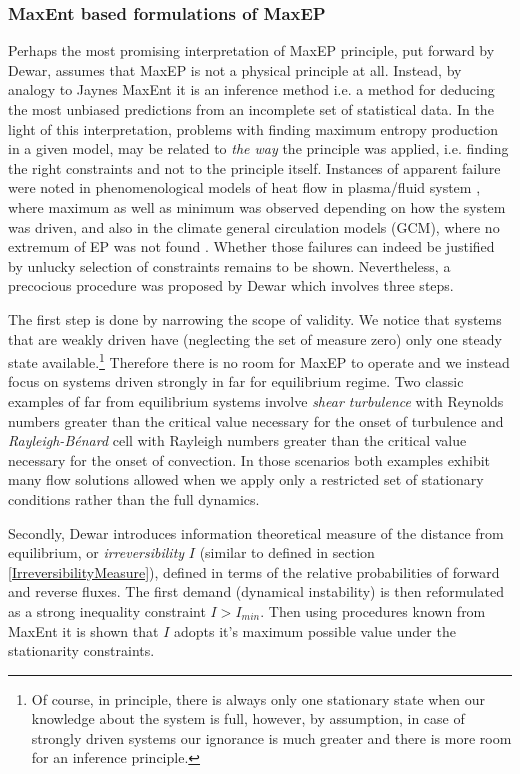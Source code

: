\documentclass[a4paper,12pt]{article}
\begin{document}
\subsubsection{MaxEnt based formulations of MaxEP}

Perhaps the most promising interpretation of MaxEP principle, put forward by Dewar\cite{Dewar:775452, Dewar:2009fg, Dewar:2005eo}, assumes that MaxEP is not a physical principle at all. Instead, by analogy to Jaynes MaxEnt it is an inference method i.e. a method for deducing the most unbiased predictions from an incomplete set of statistical data. In the light of this interpretation, problems with finding maximum entropy production in a given model, may be related to \textit{the way} the principle was applied, i.e. finding the right constraints and not to the principle itself.
Instances of apparent failure were noted in phenomenological models of heat flow in plasma/fluid system \cite{Kawazura:2010dy}, where maximum as well as minimum was observed depending on how the system was driven, and also in the climate general circulation models (GCM), where no extremum of EP was not found \cite{Dewar:2014ek}.
Whether those failures can indeed be justified by unlucky selection of constraints remains to be shown. Nevertheless, a precocious procedure was proposed by Dewar which involves three steps.

The first step is done by narrowing the scope of validity. We notice that systems that are weakly driven have (neglecting the set of measure zero) only one steady state available.\footnote{Of course, in principle, there is always only one stationary state when our knowledge about the system is full, however, by assumption, in case of strongly driven systems our ignorance is much greater and there is more room for an inference principle.} Therefore there is no room for MaxEP to operate and we instead focus on systems driven strongly in far for equilibrium regime.
Two classic examples of far from equilibrium systems involve \textit{shear turbulence} with Reynolds numbers greater than the critical value necessary for the onset of turbulence and \textit{Rayleigh-Bénard} cell with Rayleigh numbers greater than the critical value necessary for the onset of convection.
In those scenarios both examples exhibit many flow solutions allowed when we apply only a restricted set of stationary conditions rather than the full dynamics.

Secondly, Dewar introduces information theoretical measure of the distance from equilibrium, or \textit{irreversibility} $I$ (similar to defined in section \ref{IrreversibilityMeasure}), defined in terms of the relative probabilities of forward and reverse fluxes. 
The first demand (dynamical instability) is then reformulated as a strong inequality constraint $I>I_{min}$. 
Then using procedures known from MaxEnt it is shown that $I$ adopts it's maximum possible value under the stationarity constraints.
\end{document}
